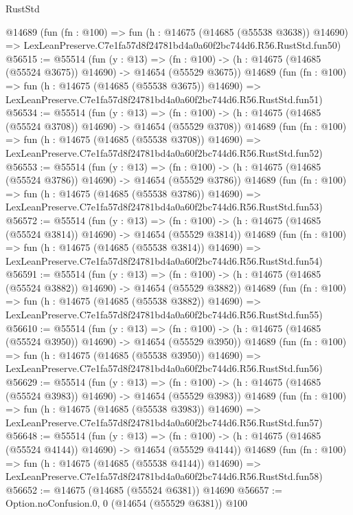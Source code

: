 \begin{lexlean}{RustStd}
\begin{coremodule}
    @14689
    (fun (fn : @100) =>
    fun (h : @14675 (@14685 (@55538 @3638)) @14690) =>
    LexLeanPreserve.C7e1fa57d8f24781bd4a0a60f2bc744d6.R56.RustStd.fun50)
@56515 := @55514
    (fun (y : @13) =>
    (fn : @100) -> (h : @14675 (@14685 (@55524 @3675)) @14690) -> @14654 (@55529 @3675))
    @14689
    (fun (fn : @100) =>
    fun (h : @14675 (@14685 (@55538 @3675)) @14690) =>
    LexLeanPreserve.C7e1fa57d8f24781bd4a0a60f2bc744d6.R56.RustStd.fun51)
@56534 := @55514
    (fun (y : @13) =>
    (fn : @100) -> (h : @14675 (@14685 (@55524 @3708)) @14690) -> @14654 (@55529 @3708))
    @14689
    (fun (fn : @100) =>
    fun (h : @14675 (@14685 (@55538 @3708)) @14690) =>
    LexLeanPreserve.C7e1fa57d8f24781bd4a0a60f2bc744d6.R56.RustStd.fun52)
@56553 := @55514
    (fun (y : @13) =>
    (fn : @100) -> (h : @14675 (@14685 (@55524 @3786)) @14690) -> @14654 (@55529 @3786))
    @14689
    (fun (fn : @100) =>
    fun (h : @14675 (@14685 (@55538 @3786)) @14690) =>
    LexLeanPreserve.C7e1fa57d8f24781bd4a0a60f2bc744d6.R56.RustStd.fun53)
@56572 := @55514
    (fun (y : @13) =>
    (fn : @100) -> (h : @14675 (@14685 (@55524 @3814)) @14690) -> @14654 (@55529 @3814))
    @14689
    (fun (fn : @100) =>
    fun (h : @14675 (@14685 (@55538 @3814)) @14690) =>
    LexLeanPreserve.C7e1fa57d8f24781bd4a0a60f2bc744d6.R56.RustStd.fun54)
@56591 := @55514
    (fun (y : @13) =>
    (fn : @100) -> (h : @14675 (@14685 (@55524 @3882)) @14690) -> @14654 (@55529 @3882))
    @14689
    (fun (fn : @100) =>
    fun (h : @14675 (@14685 (@55538 @3882)) @14690) =>
    LexLeanPreserve.C7e1fa57d8f24781bd4a0a60f2bc744d6.R56.RustStd.fun55)
@56610 := @55514
    (fun (y : @13) =>
    (fn : @100) -> (h : @14675 (@14685 (@55524 @3950)) @14690) -> @14654 (@55529 @3950))
    @14689
    (fun (fn : @100) =>
    fun (h : @14675 (@14685 (@55538 @3950)) @14690) =>
    LexLeanPreserve.C7e1fa57d8f24781bd4a0a60f2bc744d6.R56.RustStd.fun56)
@56629 := @55514
    (fun (y : @13) =>
    (fn : @100) -> (h : @14675 (@14685 (@55524 @3983)) @14690) -> @14654 (@55529 @3983))
    @14689
    (fun (fn : @100) =>
    fun (h : @14675 (@14685 (@55538 @3983)) @14690) =>
    LexLeanPreserve.C7e1fa57d8f24781bd4a0a60f2bc744d6.R56.RustStd.fun57)
@56648 := @55514
    (fun (y : @13) =>
    (fn : @100) -> (h : @14675 (@14685 (@55524 @4144)) @14690) -> @14654 (@55529 @4144))
    @14689
    (fun (fn : @100) =>
    fun (h : @14675 (@14685 (@55538 @4144)) @14690) =>
    LexLeanPreserve.C7e1fa57d8f24781bd4a0a60f2bc744d6.R56.RustStd.fun58)
@56652 := @14675 (@14685 (@55524 @6381)) @14690
@56657 := Option.noConfusion.{0, 0} (@14654 (@55529 @6381)) @100

\end{coremodule}
\end{lexlean}
